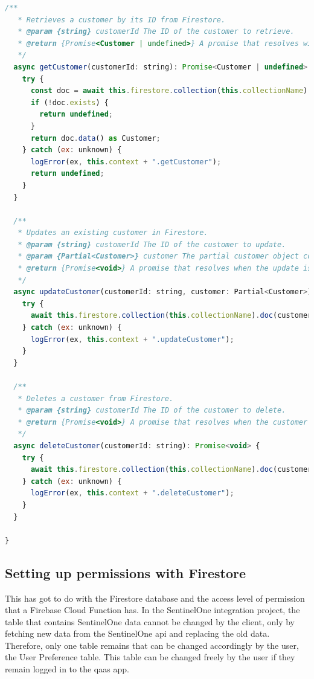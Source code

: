 \begin{lstlisting}[language=JavaScript, caption={Model class in the back-end}]
  /**
   * Retrieves a customer by its ID from Firestore.
   * @param {string} customerId The ID of the customer to retrieve.
   * @return {Promise<Customer | undefined>} A promise that resolves with the customer object if found, or undefined if not found or an error occurs.
   */
  async getCustomer(customerId: string): Promise<Customer | undefined> {
    try {
      const doc = await this.firestore.collection(this.collectionName).doc(customerId).get();
      if (!doc.exists) {
        return undefined;
      }
      return doc.data() as Customer;
    } catch (ex: unknown) {
      logError(ex, this.context + ".getCustomer");
      return undefined;
    }
  }

  /**
   * Updates an existing customer in Firestore.
   * @param {string} customerId The ID of the customer to update.
   * @param {Partial<Customer>} customer The partial customer object containing updates.
   * @return {Promise<void>} A promise that resolves when the update is complete.
   */
  async updateCustomer(customerId: string, customer: Partial<Customer>): Promise<void> {
    try {
      await this.firestore.collection(this.collectionName).doc(customerId).update(customer);
    } catch (ex: unknown) {
      logError(ex, this.context + ".updateCustomer");
    }
  }

  /**
   * Deletes a customer from Firestore.
   * @param {string} customerId The ID of the customer to delete.
   * @return {Promise<void>} A promise that resolves when the customer is successfully deleted.
   */
  async deleteCustomer(customerId: string): Promise<void> {
    try {
      await this.firestore.collection(this.collectionName).doc(customerId).delete();
    } catch (ex: unknown) {
      logError(ex, this.context + ".deleteCustomer");
    }
  }

}
\end{lstlisting}
\subsection{Setting up permissions with Firestore}

This has got to do with the Firestore database and the access level of permission that a Firebase Cloud Function has. In the
SentinelOne integration project, the table that contains SentinelOne data cannot be changed by the client, only by fetching new
data from the SentinelOne \acrshort{api} and replacing the old data. Therefore, only one table remains that can be
changed accordingly by the user, the User Preference table. This table can be changed freely by the user if they remain
logged in to the \acrshort{qaas} app.


